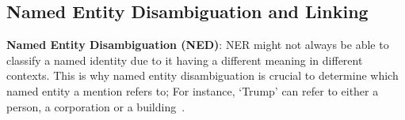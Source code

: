 

\subsection{Named Entity Disambiguation and Linking}

\textbf{Named Entity Disambiguation (NED)}: NER might not always be able to classify a named identity due to it having a different meaning in different contexts. This is why named entity disambiguation is crucial to determine which
named entity a mention refers to; For instance, `Trump' can refer to either a person, a corporation or a building~\cite{ieee_named_entity}.

